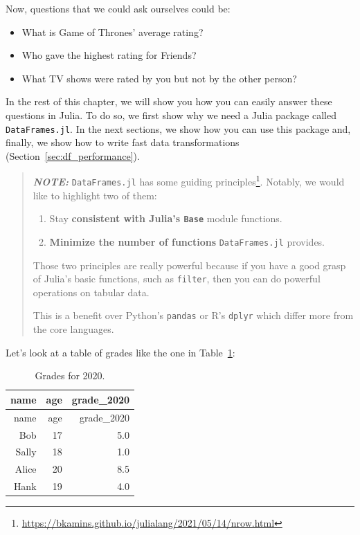 \documentclass[
  notoc %
]{tufte-book}
\DeclareRobustCommand{\href}[2]{#2\footnote{\url{#1}}}
\providecommand{\tightlist}{%
  \setlength{\itemsep}{0pt}\setlength{\parskip}{0pt}
}
\newcommand{\passthrough}[1]{#1}
\begin{document}
Now, questions that we could ask ourselves could be:

\begin{itemize}
\tightlist
\item
  What is Game of Thrones' average rating?
\item
  Who gave the highest rating for Friends?
\item
  What TV shows were rated by you but not by the other person?
\end{itemize}

In the rest of this chapter, we will show you how you can easily answer
these questions in Julia. To do so, we first show why we need a Julia
package called \passthrough{\lstinline!DataFrames.jl!}. In the next
sections, we show how you can use this package and, finally, we show how
to write fast data transformations (Section~\ref{sec:df_performance}).

\begin{quote}
\textbf{\emph{NOTE:}} \passthrough{\lstinline!DataFrames.jl!} has some
\href{https://bkamins.github.io/julialang/2021/05/14/nrow.html}{guiding
principles}. Notably, we would like to highlight two of them:

\begin{enumerate}
\def\labelenumi{\arabic{enumi}.}
\tightlist
\item
  Stay \textbf{consistent with Julia's \passthrough{\lstinline!Base!}}
  module functions.
\item
  \textbf{Minimize the number of functions}
  \passthrough{\lstinline!DataFrames.jl!} provides.
\end{enumerate}

Those two principles are really powerful because if you have a good
grasp of Julia's basic functions, such as
\passthrough{\lstinline!filter!}, then you can do powerful operations on
tabular data.

This is a benefit over Python's \passthrough{\lstinline!pandas!} or R's
\passthrough{\lstinline!dplyr!} which differ more from the core
languages.
\end{quote}

Let's look at a table of grades like the one in
Table~\ref{tbl:grades_for_2020}:

\hypertarget{tbl:grades_for_2020}{}
\begin{longtable}[]{@{}rrr@{}}
\caption{\label{tbl:grades_for_2020}Grades for 2020.}\tabularnewline
\toprule()
name & age & grade\_2020 \\
\midrule()
\endfirsthead
\toprule()
name & age & grade\_2020 \\
\midrule()
\endhead
Bob & 17 & 5.0 \\
Sally & 18 & 1.0 \\
Alice & 20 & 8.5 \\
Hank & 19 & 4.0 \\
\bottomrule()
\end{longtable}
\end{document}
